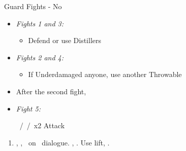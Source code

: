 \begin{battle}{Guard Fights - No \sleepingpowder}
	\begin{itemize}
		\item \textit{Fights 1 and 3:}
		      \begin{itemize}
			      \tidusf Attack
			      \item Defend or use Distillers
		      \end{itemize}
		\item \textit{Fights 2 and 4:}
		      \begin{itemize}
			      \switch{\tidus}{\kimahri}
			      \kimahrif \bombcore\ /\silencegrenade\ /\smokebomb\
			      \switch{\rikku}{\tidus}
			      \tidusf Attack
			      \kimahrif Repeat
			      \item If Underdamaged anyone, use another Throwable
		      \end{itemize}
		\item After the second fight, \formation{\tidus}{\rikku}{\lulu}
		\item \textit{Fight 5:}
		      \begin{itemize}
			      \switch{\tidus}{\rikku}
			      \rikkuf \bombcore\ /\silencegrenade\ /\smokebomb\ x2
			      \switch{\kimahri}{\tidus}
			      \tidusf Attack
		      \end{itemize}
	\end{itemize}
\end{battle}
\begin{enumerate}[resume]
	\item \sd, \skippablefmv, \sd\ on \yuna\ dialogue. \skippablefmv, \sd. Use lift, \sd.
\end{enumerate}
\bothvfill
\winvfill
\lossvfill
\ 
